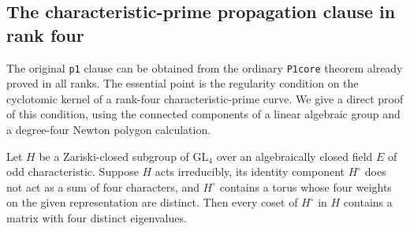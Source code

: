 \subsection{The characteristic-prime propagation clause in rank four}
\label{subsec:rh-four-p1}

The original \texttt{p1} clause can be obtained from the
ordinary \texttt{P1core} theorem already proved in all ranks.
The essential point is the regularity condition on the
cyclotomic kernel of a rank-four characteristic-prime curve.
We give a direct proof of this condition, using the connected
components of a linear algebraic group and a degree-four
Newton polygon calculation.

\begin{lemma}
\label{lem:rh-four-regular-coset}
Let $H$ be a Zariski-closed subgroup of $\mathrm{GL}_4$ over
an algebraically closed field $E$ of odd characteristic.
Suppose $H$ acts irreducibly, its identity component $H^\circ$
does not act as a sum of four characters, and $H^\circ$ contains
a torus whose four weights on the given representation are
distinct. Then every coset of $H^\circ$ in $H$ contains a
matrix with four distinct eigenvalues.
\end{lemma}
